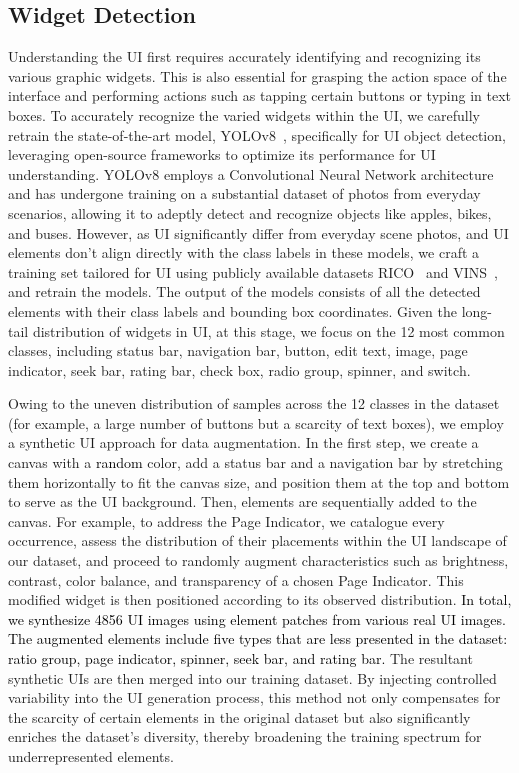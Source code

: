 \subsection{Widget Detection}
\label{sec:widget}
Understanding the UI first requires accurately identifying and recognizing its various graphic widgets. This is also essential for grasping the action space of the interface and performing actions such as tapping certain buttons or typing in text boxes. To accurately recognize the varied widgets within the UI, we carefully retrain the state-of-the-art model, YOLOv8~\cite{Jocher_YOLO_by_Ultralytics_2023}, specifically for UI object detection, leveraging open-source frameworks to optimize its performance for UI understanding. YOLOv8 employs a Convolutional Neural Network architecture and has undergone training on a substantial dataset of photos from everyday scenarios, allowing it to adeptly detect and recognize objects like apples, bikes, and buses. However, as UI significantly differ from everyday scene photos, and UI elements don't align directly with the class labels in these models, we craft a training set tailored for UI using publicly available datasets RICO~\cite{deka2017rico} and VINS~\cite{bunian2021vins}, and retrain the models. The output of the models consists of all the detected elements with their class labels and bounding box coordinates. Given the long-tail distribution of widgets in UI, at this stage, we focus on the 12 most common classes, including status bar, navigation bar, button, edit text, image, page indicator, seek bar, rating bar, check box, radio group, spinner, and switch.

Owing to the uneven distribution of samples across the 12 classes in the dataset (for example, a large number of buttons but a scarcity of text boxes), we employ a synthetic UI approach for data augmentation. In the first step, we create a canvas with a \textcolor{black}{random} color, add a status bar and a navigation bar by stretching them horizontally to fit the canvas size, and position them at the top and bottom to serve as the UI background. Then, elements are sequentially added to the canvas. For example, to address the Page Indicator, we catalogue every occurrence, assess the distribution of their placements within the UI landscape of our dataset, and proceed to randomly augment characteristics such as brightness, contrast, color balance, and transparency of a chosen Page Indicator. This modified widget is then positioned according to its observed distribution. 
\textcolor{black}{In total, we synthesize 4856 UI images using element patches from various real UI images. The augmented elements include five types that are less presented in the dataset: ratio group, page indicator, spinner, seek bar, and rating bar.} The resultant synthetic UIs are then merged into our training dataset. By injecting controlled variability into the UI generation process, this method not only compensates for the scarcity of certain elements in the original dataset but also significantly enriches the dataset's diversity, thereby broadening the training spectrum for underrepresented elements.

